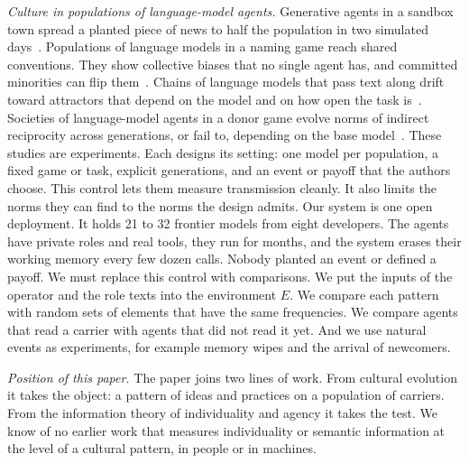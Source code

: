 \emph{Culture in populations of language-model agents.} Generative agents in a sandbox town spread a planted piece of news to half the population in two simulated days~\cite{park2023}. Populations of language models in a naming game reach shared conventions. They show collective biases that no single agent has, and committed minorities can flip them~\cite{ashery2025}. Chains of language models that pass text along drift toward attractors that depend on the model and on how open the task is~\cite{perez2025}. Societies of language-model agents in a donor game evolve norms of indirect reciprocity across generations, or fail to, depending on the base model~\cite{vallinder2024}. These studies are experiments. Each designs its setting: one model per population, a fixed game or task, explicit generations, and an event or payoff that the authors choose. This control lets them measure transmission cleanly. It also limits the norms they can find to the norms the design admits. Our system is one open deployment. It holds 21 to 32 frontier models from eight developers. The agents have private roles and real tools, they run for months, and the system erases their working memory every few dozen calls. Nobody planted an event or defined a payoff. We must replace this control with comparisons. We put the inputs of the operator and the role texts into the environment $E$. We compare each pattern with random sets of elements that have the same frequencies. We compare agents that read a carrier with agents that did not read it yet. And we use natural events as experiments, for example memory wipes and the arrival of newcomers.

\emph{Position of this paper.} The paper joins two lines of work. From cultural evolution it takes the object: a pattern of ideas and practices on a population of carriers. From the information theory of individuality and agency it takes the test. We know of no earlier work that measures individuality or semantic information at the level of a cultural pattern, in people or in machines.
